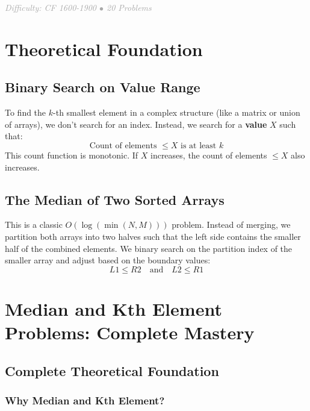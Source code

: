 \documentclass[11pt,a4paper,oneside]{book}
\begin{document}
\begin{center}
\textit{\textcolor{darkgray}{Difficulty: CF 1600-1900 $\bullet$ 20 Problems}}
\end{center}

\section{Theoretical Foundation}

\subsection{Binary Search on Value Range}
To find the $k$-th smallest element in a complex structure (like a matrix or union of arrays), we don't search for an index. Instead, we search for a \textbf{value} $X$ such that:
\[ \text{Count of elements } \leq X \text{ is at least } k \]
This count function is monotonic. If $X$ increases, the count of elements $\leq X$ also increases.



\subsection{The Median of Two Sorted Arrays}
This is a classic $O(\log(\min(N, M)))$ problem. Instead of merging, we partition both arrays into two halves such that the left side contains the smaller half of the combined elements. We binary search on the partition index of the smaller array and adjust based on the boundary values:
\[ L1 \leq R2 \quad \text{and} \quad L2 \leq R1 \]

\section{Median and Kth Element Problems: Complete Mastery}

\subsection{Complete Theoretical Foundation}

\subsubsection{Why Median and Kth Element?}
\end{document}
